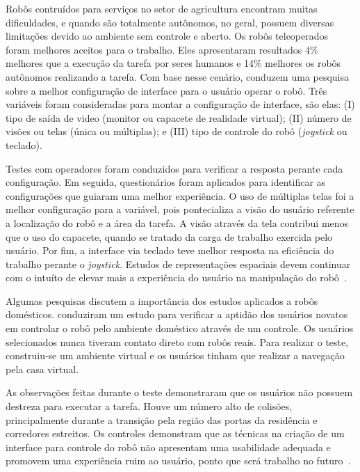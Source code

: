 Robôs contruídos para serviços no setor de agricultura encontram muitas dificuldades, e quando são totalmente autônomos, no geral, possuem diversas limitações devido ao ambiente sem controle e aberto. Os robôs teleoperados foram melhores aceitos para o trabalho. Eles apresentaram resultados 4\% melhores que a execução da tarefa por seres humanos e 14\% melhores os robôs autônomos realizando a tarefa. Com base nesse cenário, \textcite{adamides:2017} conduzem uma pesquisa sobre a melhor configuração de interface para o usuário operar o robô. Três variáveis foram consideradas para montar a configuração de interface, são elas: (I) tipo de saída de video (monitor ou capacete de realidade virtual); (II) número de visões ou telas (única ou múltiplas); e (III) tipo de controle do robô (\emph{joystick} ou teclado).

Testes com operadores foram conduzidos para verificar a resposta perante cada configuração. Em seguida, questionários foram aplicados para identificar as configurações que guiaram uma melhor experiência. O uso de múltiplas telas foi a melhor configuração para a variável, pois pontecializa a visão do usuário referente a localização do robô e a área da tarefa. A visão através da tela contribui menos que o uso do capacete, quando se tratado da carga de trabalho exercida pelo usuário. Por fim, a interface via teclado teve melhor resposta na eficiência do trabalho perante o \emph{joystick}. Estudos de representações espaciais devem continuar com o intuíto de elevar mais a experiência do usuário na manipulação do robô~\cite{adamides:2017}.

Algumas pesquisas discutem a importância dos estudos aplicados a robôs domésticos. \textcite{mcginn:2017} conduziram um estudo para verificar a aptidão dos usuários novatos em controlar o robô pelo ambiente doméstico através de um controle. Os usuários selecionados nunca tiveram contato direto com robôs reais. Para realizar o teste, construiu-se um ambiente virtual e os usuários tinham que realizar a navegação pela casa virtual.

As observações feitas durante o teste demonstraram que os usuários não possuem destreza para executar a tarefa. Houve um número alto de colisões, principalmente durante a transição pela região das portas da residência e corredores estreitos. Os controles demonstram que as técnicas na criação de um interface para controle do robô não apresentam uma usabilidade adequada e promovem uma experiência ruim ao usuário, ponto que será trabalho no futuro~\cite{mcginn:2017}.

